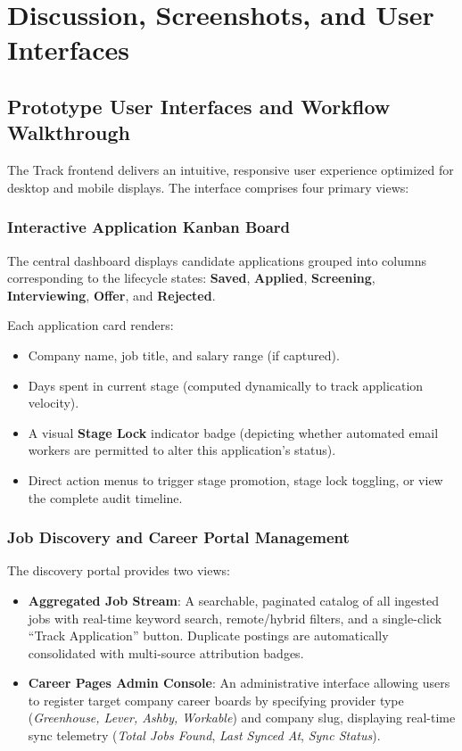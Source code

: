 \chapter{Discussion, Screenshots, and User Interfaces}
\label{ch:discussion_ui}

\section{Prototype User Interfaces and Workflow Walkthrough}
The Track frontend delivers an intuitive, responsive user experience optimized for desktop and mobile displays. The interface comprises four primary views:

\subsection{Interactive Application Kanban Board}
The central dashboard displays candidate applications grouped into columns corresponding to the lifecycle states: \textbf{Saved}, \textbf{Applied}, \textbf{Screening}, \textbf{Interviewing}, \textbf{Offer}, and \textbf{Rejected}.

Each application card renders:
\begin{itemize}
    \item Company name, job title, and salary range (if captured).
    \item Days spent in current stage (computed dynamically to track application velocity).
    \item A visual \textbf{Stage Lock} indicator badge (depicting whether automated email workers are permitted to alter this application's status).
    \item Direct action menus to trigger stage promotion, stage lock toggling, or view the complete audit timeline.
\end{itemize}

\subsection{Job Discovery and Career Portal Management}
The discovery portal provides two views:
\begin{itemize}
    \item \textbf{Aggregated Job Stream}: A searchable, paginated catalog of all ingested jobs with real-time keyword search, remote/hybrid filters, and a single-click ``Track Application'' button. Duplicate postings are automatically consolidated with multi-source attribution badges.
    \item \textbf{Career Pages Admin Console}: An administrative interface allowing users to register target company career boards by specifying provider type (\textit{Greenhouse, Lever, Ashby, Workable}) and company slug, displaying real-time sync telemetry (\textit{Total Jobs Found}, \textit{Last Synced At}, \textit{Sync Status}).
\end{itemize}

